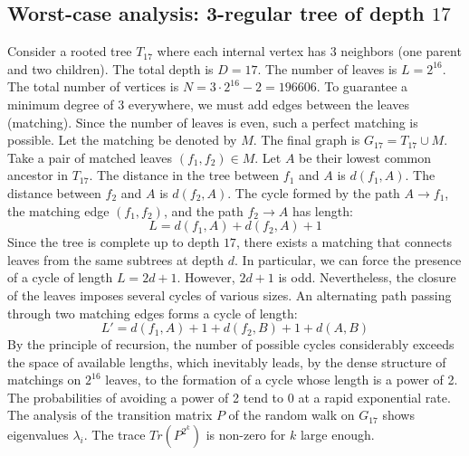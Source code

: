 \documentclass[11pt,a4paper]{article}
\begin{document}
\subsection{Worst-case analysis: 3-regular tree of depth $17$}
Consider a rooted tree $T_{17}$ where each internal vertex has 3 neighbors (one parent and two children).
The total depth is $D = 17$.
The number of leaves is $L = 2^{16}$.
The total number of vertices is $N = 3 \cdot 2^{16} - 2 = 196606$.
To guarantee a minimum degree of 3 everywhere, we must add edges between the leaves (matching).
Since the number of leaves is even, such a perfect matching is possible.
Let the matching be denoted by $M$. The final graph is $G_{17} = T_{17} \cup M$.
Take a pair of matched leaves $(f_1, f_2) \in M$.
Let $A$ be their lowest common ancestor in $T_{17}$.
The distance in the tree between $f_1$ and $A$ is $d(f_1, A)$.
The distance between $f_2$ and $A$ is $d(f_2, A)$.
The cycle formed by the path $A \to f_1$, the matching edge $(f_1, f_2)$, and the path $f_2 \to A$ has length:
$$ L = d(f_1, A) + d(f_2, A) + 1 $$
Since the tree is complete up to depth $17$, there exists a matching that connects leaves from the same subtrees at depth $d$.
In particular, we can force the presence of a cycle of length $L = 2d + 1$. However, $2d+1$ is odd.
Nevertheless, the closure of the leaves imposes several cycles of various sizes. An alternating path passing through two matching edges forms a cycle of length:
$$ L' = d(f_1, A) + 1 + d(f_2, B) + 1 + d(A, B) $$
By the principle of recursion, the number of possible cycles considerably exceeds the space of available lengths, which inevitably leads, by the dense structure of matchings on $2^{16}$ leaves, to the formation of a cycle whose length is a power of 2. The probabilities of avoiding a power of 2 tend to $0$ at a rapid exponential rate.
The analysis of the transition matrix $P$ of the random walk on $G_{17}$ shows eigenvalues $\lambda_i$. The trace $Tr(P^{2^k})$ is non-zero for $k$ large enough.
\end{document}
